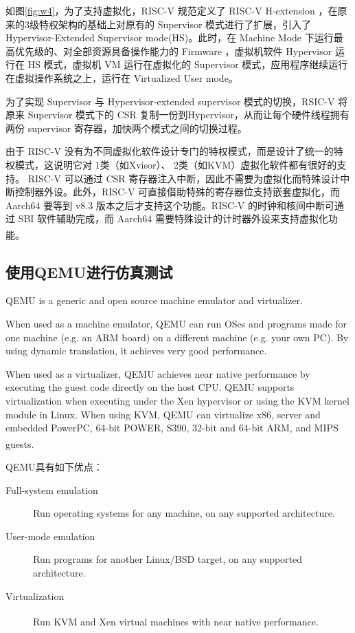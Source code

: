 \documentclass[UTF8,fontset=none,linespread=1.15]{ctexart}
\let\nosupcite\cite
\renewcommand*{\cite}[1]{\textsuperscript{\nosupcite{#1}}}
\begin{document}
如图\ref{fig:w4}，为了支持虚拟化，RISC-V 规范定义了 RISC-V H-extension ，在原来的3级特权架构的基础上对原有的 Supervisor 模式进行了扩展，引入了 Hypervisor-Extended Supervisor mode(HS)。此时，在 Machine Mode 下运行最高优先级的、对全部资源具备操作能力的 Firmware ，虚拟机软件 Hypervisor 运行在 HS 模式，虚拟机 VM 运行在虚拟化的 Supervisor 模式，应用程序继续运行在虚拟操作系统之上，运行在 Virtualized User mode。

为了实现 Supervisor 与 Hypervisor-extended supervisor 模式的切换，RSIC-V 将原来 Supervisor 模式下的 CSR 复制一份到Hypervisor，从而让每个硬件线程拥有两份 supervisor 寄存器，加快两个模式之间的切换过程。

由于 RISC-V 没有为不同虚拟化软件设计专门的特权模式，而是设计了统一的特权模式，这说明它对 1类（如Xvisor）、 2类（如KVM）虚拟化软件都有很好的支持。 RISC-V 可以通过 CSR 寄存器注入中断，因此不需要为虚拟化而特殊设计中断控制器外设。此外，RISC-V 可直接借助特殊的寄存器位支持嵌套虚拟化，而 Aarch64 要等到 v8.3 版本之后才支持这个功能。RISC-V 的时钟和核间中断可通过 SBI 软件辅助完成，而 Aarch64 需要特殊设计的计时器外设来支持虚拟化功能。\cite{d}

\subsection{使用QEMU进行仿真测试}

QEMU is a generic and open source machine emulator and virtualizer.

When used as a machine emulator, QEMU can run OSes and programs made for one machine (e.g. an ARM board) on a different machine (e.g. your own PC). By using dynamic translation, it achieves very good performance.

When used as a virtualizer, QEMU achieves near native performance by executing the guest code directly on the host CPU. QEMU supports virtualization when executing under the Xen hypervisor or using the KVM kernel module in Linux. When using KVM, QEMU can virtualize x86, server and embedded PowerPC, 64-bit POWER, S390, 32-bit and 64-bit ARM, and MIPS guests.\cite{1}

\noindent QEMU具有如下优点：

\begin{description}
\item[Full-system emulation] Run operating systems for any machine, on any supported architecture.
\item[User-mode emulation] Run programs for another Linux/BSD target, on any supported architecture.
\item[Virtualization] Run KVM and Xen virtual machines with near native performance.\cite{1}
\end{description}
\end{document}

